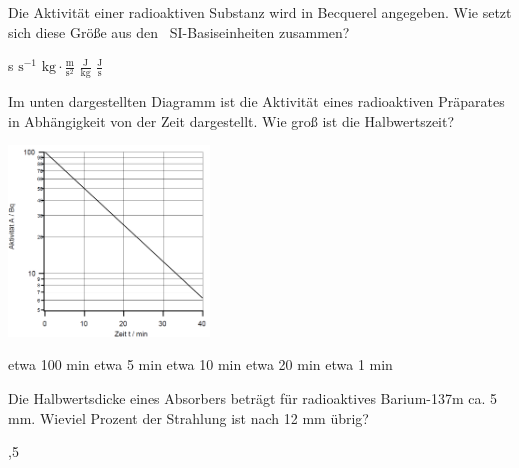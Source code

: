 \documentclass[11pt]{exam}
\begin{document}
\setlength{\voffset}{-0.5in}
\setlength{\headsep}{5pt}

\hspace{2mm}
 \hspace{5mm}
\vspace{4mm}

\begin{questions}

\question Die Aktivität einer radioaktiven Substanz wird in Becquerel angegeben. Wie setzt sich diese Größe aus den  SI-Basiseinheiten zusammen?

\begin{choices}
	\choice s
	\choice \( \text{s}^{-1} \)
	\choice \( \text{kg}\cdot\frac{\text{m}}{\text{s}^2} \)
	\choice \( \frac{\text{J}}{\text{kg}} \)
	\choice \( \frac{\text{J}}{\text{s}} \)
\end{choices}

\vspace{3mm}\question Im unten dargestellten Diagramm ist die Aktivität eines radioaktiven Präparates in Abhängigkeit von der Zeit dargestellt. Wie groß ist die Halbwertszeit? 

\includegraphics[width=0.4\textwidth]{images/zerfallsgesetz.png}

\begin{choices}
	\choice etwa 100 min
	\choice etwa 5 min
	\choice etwa 10 min
	\choice etwa 20 min
	\choice etwa 1 min
\end{choices}

\vspace{3mm}\question Die Halbwertsdicke eines Absorbers beträgt für radioaktives Barium-137m ca. 5 mm. Wieviel Prozent der Strahlung ist nach 12 mm übrig?

\begin{choices}
	,5 %
\end{choices}


\end{questions}
\end{document}
